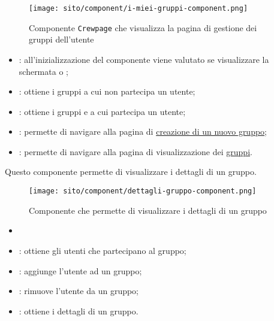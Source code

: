 \begin{figure}[H]
    \centering
    \texttt{[image: sito/component/i-miei-gruppi-component.png]}
    \caption{Componente \texttt{Crewpage} che visualizza la pagina di gestione
        dei gruppi dell'utente}
\end{figure}


\begin{itemize}
    \item {}: all'inizializzazione del componente viene valutato
          se visualizzare la schermata  o
          ;
    \item {}: ottiene i gruppi a cui non partecipa un
          utente;
    \item {}:	ottiene i gruppi e a cui partecipa un
          utente;
    \item {}: permette di navigare alla pagina di
          \hyperref[par:Crea nuovo gruppo]{creazione di un nuovo gruppo};
    \item {}: permette di navigare alla pagina di
          visualizzazione dei \hyperref[par:Gruppi]{gruppi}.
\end{itemize}

\label{par:CrewDetail}
Questo componente permette di visualizzare i dettagli di un gruppo.
\begin{figure}[H]
    \centering
    \texttt{[image: sito/component/dettagli-gruppo-component.png]}
    \caption{Componente che permette di visualizzare i dettagli di un gruppo}
\end{figure}
\begin{itemize}
    \item {}
\end{itemize}


\begin{itemize}
    \item {}: ottiene gli utenti che partecipano al
          gruppo;
    \item {}: aggiunge l'utente ad un gruppo;
    \item {}: rimuove l'utente da un gruppo;
    \item {}: ottiene i dettagli di un gruppo.
\end{itemize}

